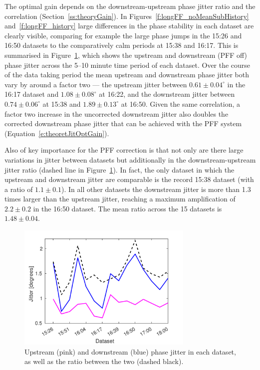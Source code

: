 The optimal gain depends on the downstream-upstream phase jitter ratio and the correlation (Section~\ref{ss:theoryGain}). In Figures~\ref{f:longFF_noMeanSubHistory} and~\ref{f:longFF_history} large differences in the phase stability in each dataset are clearly visible, comparing for example the large phase jumps in the 15:26 and 16:50 datasets to the comparatively calm periods at 15:38 and 16:17. This is summarised in Figure~\ref{f:longFF_jitFFOff}, which shows the upstream and downstream (PFF off) phase jitter across the 5--10 minute time period of each dataset. Over the course of the data taking period the mean upstream and downstream phase jitter both vary by around a factor two --- the upstream jitter between \(0.61\pm0.04^\circ\) in the 16:17 dataset and \(1.08\pm0.08^\circ\) at 16:22, and the downstream jitter between \(0.74\pm0.06^\circ\) at 15:38 and \(1.89\pm0.13^\circ\) at 16:50. Given the same correlation, a factor two increase in the uncorrected downstream jitter also doubles the corrected downstream phase jitter that can be achieved with the PFF system (Equation~\ref{e:theoretJitOptGain}).

Also of key importance for the PFF correction is that not only are there large variations in jitter between datasets but additionally in the downstream-upstream jitter ratio (dashed line in Figure~\ref{f:longFF_jitFFOff}). In fact, the only dataset in which the upstream and downstream jitter are comparable is the record 15:38 dataset (with a ratio of \(1.1\pm0.1\)). In all other datasets the downstream jitter is more than 1.3 times larger than the upstream jitter, reaching a maximum amplification of \(2.2\pm0.2\) in the 16:50 dataset. The mean ratio across the 15 datasets is \(1.48\pm0.04\).

\begin{figure}
  \centering
  \includegraphics[width=0.75\textwidth]{Figures/feedforward/longFF_jitDatSetFFOff}
  \caption{Upstream (pink) and downstream (blue) phase jitter in each dataset, as well as the ratio between the two (dashed black).}
  \label{f:longFF_jitFFOff}
\end{figure}

